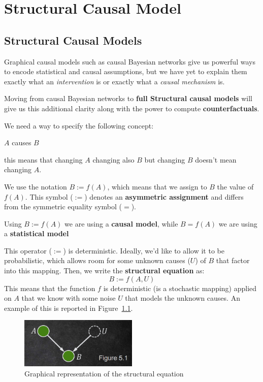\chapter{Structural Causal Model}
\section{Structural Causal Models}
Graphical causal models such as causal Bayesian networks give us powerful ways to
encode statistical and causal assumptions, but we have yet to explain them exactly
what an \textit{intervention} is or exactly what a \textit{causal mechanism} is.

Moving from causal Bayesian networks to \textbf{full Structural causal models}
will give us this additional clarity along with the power to compute \textbf{counterfactuals}.

We need a way to specify the following concept:
\begin{center}
    $A$ causes $B$
\end{center}
this means that changing $A$ changing also $B$ but changing $B$ doesn't mean changing $A$.

We use the notation $B := f(A)$, which means that we assign to $B$ the value of
$f(A)$. This symbol ($:=$) denotes an \textbf{asymmetric assignment} and differs
from the symmetric equality symbol ($=$).

\begin{note}
    Using $B := f(A)$ we are using a \textbf{causal model}, while $B = f(A)$ we
    are using a \textbf{statistical model}
\end{note}

This operator ($:=$) is deterministic. Ideally, we'd like to allow it to be
probabilistic, which allows room for some unknown causes ($U$) of $B$ that factor
into this mapping. Then, we write the \textbf{structural equation} as:
\begin{equation*}
    B := f(A, U)
\end{equation*}
This means that the function $f$ is deterministic (is a stochastic mapping)
applied on $A$ that we know with some noise $U$ that models the unknown causes.
An example of this is reported in Figure~\ref{fig:unknown_graphs}.

\begin{figure}[!ht]
    \centering
    \includegraphics[width=0.5\textwidth]{img/structural_causal_model/unknown_graphs.png}
    \caption{Graphical representation of the structural equation}
    \label{fig:unknown_graphs}
\end{figure}

